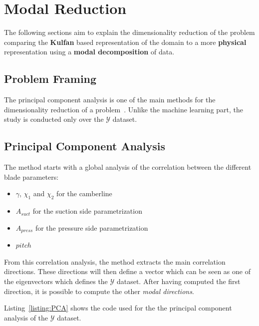 \chapter{Modal Reduction}

\renewcommand\scaleBlade{0.64}

The following sections aim to explain the dimensionality reduction of the problem comparing the \textbf{Kulfan} based representation of the domain 
to a more \textbf{physical} representation using a \textbf{modal decomposition} of data. 

\section{Problem Framing}

The principal component analysis is one of the main methods for the dimensionality reduction of a problem~\cite{geron2022hands}. 
Unlike the machine learning part, the study is conducted only over the $\mathcal{Y}$ dataset. 

\section{Principal Component Analysis}

The method starts with a global analysis of the correlation between the different blade parameters:

\begin{itemize}
    \item $\gamma$, $\chi_1$ and $\chi_2$ for the camberline
    \item $A_{suct}$ for the suction side parametrization
    \item $A_{press}$ for the pressure side parametrization
    \item $pitch$
\end{itemize}

From this correlation analysis, the method extracts the main correlation directions. 
These directions will then define a vector which can be seen as one of the eigenvectors which defines the $\mathcal{Y}$ dataset.
After having computed the first direction, it is possible to compute the other \textit{modal directions}.

Listing~\ref{listing:PCA} shows the code used for the the principal component analysis of the $\mathcal{Y}$ dataset.



